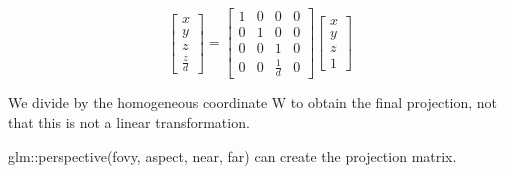 			\begin{equation}
				\begin{bmatrix} x\\ y \\z  \\ \frac{z} {d}  \end{bmatrix} = \begin{bmatrix} 1& 0& 0& 0\\ 
			 		                0& 1& 0& 0\\
			 		                0& 0& 1& 0\\
			 		                0& 0& \frac{1}{d} & 0\end{bmatrix} \begin{bmatrix} x \\ y \\ z \\ 1 \end{bmatrix}
			\end{equation}

		We divide by the homogeneous coordinate W to obtain the final projection, not that this is not a linear transformation. 

		\noindent glm::perspective(fovy, aspect, near, far) can create the projection matrix. 




